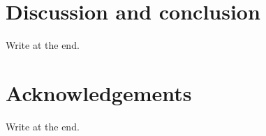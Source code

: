 \documentclass[fleqn,usenatbib]{mnras}
\begin{document}

\section{Discussion and conclusion}
\label{sec:discon}
Write at the end.

\section*{Acknowledgements}
Write at the end.
\end{document}

